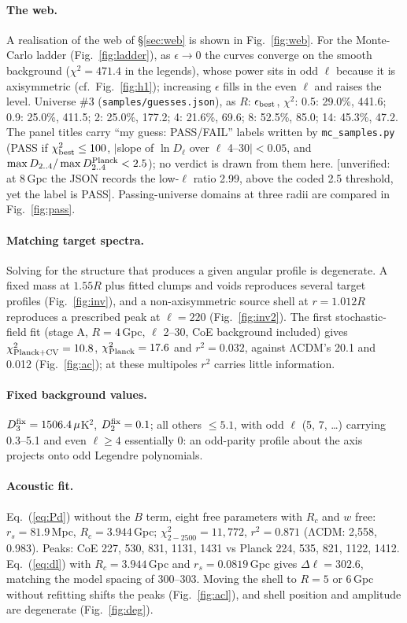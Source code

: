 \documentclass[10pt,twocolumn]{article}
\newcommand{\flag}[1]{\textsf{[unverified: #1]}}
\begin{document}
\paragraph{The web.} A realisation of the web of \S\ref{sec:web} is shown in Fig.~\ref{fig:web}. For the Monte-Carlo ladder (Fig.~\ref{fig:ladder}), as $\epsilon\to0$ the curves converge on the smooth background ($\chi^2=471.4$ in the legends), whose power sits in odd $\ell$ because it is axisymmetric (cf.\ Fig.~\ref{fig:h1}); increasing $\epsilon$ fills in the even $\ell$ and raises the level. Universe \#3 (\texttt{samples/guesses.json}), as $R$: $\epsilon_{\rm best}$, $\chi^2$: 0.5: 29.0\%, 441.6; 0.9: 25.0\%, 411.5; 2: 25.0\%, 177.2; 4: 21.6\%, 69.6; 8: 52.5\%, 85.0; 14: 45.3\%, 47.2. The panel titles carry ``my guess: PASS/FAIL'' labels written by \texttt{mc\_samples.py} (PASS if $\chi^2_{\rm best}\le100$, $|$slope of $\ln D_\ell$ over $\ell$ 4--30$|<0.05$, and $\max D_{2..4}/\max D^{\rm Planck}_{2..4}<2.5$); no verdict is drawn from them here. \flag{at 8\,Gpc the JSON records the low-$\ell$ ratio 2.99, above the coded 2.5 threshold, yet the label is PASS}. Passing-universe domains at three radii are compared in Fig.~\ref{fig:pass}.

\paragraph{Matching target spectra.} Solving for the structure that produces a given angular profile is degenerate. A fixed mass at $1.55R$ plus fitted clumps and voids reproduces several target profiles (Fig.~\ref{fig:inv}), and a non-axisymmetric source shell at $r=1.012R$ reproduces a prescribed peak at $\ell=220$ (Fig.~\ref{fig:inv2}). The first stochastic-field fit (stage A, $R=4$\,Gpc, $\ell$ 2--30, CoE background included) gives $\chi^2_{\rm Planck+CV}=10.8$, $\chi^2_{\rm Planck}=17.6$ and $r^2=0.032$, against ΛCDM's 20.1 and 0.012 (Fig.~\ref{fig:ac}); at these multipoles $r^2$ carries little information.

\paragraph{Fixed background values.} $D^{\rm fix}_3=1506.4\,\mu$K$^2$, $D^{\rm fix}_2=0.1$; all others $\le5.1$, with odd $\ell$ (5, 7, \ldots) carrying 0.3--5.1 and even $\ell\ge4$ essentially 0: an odd-parity profile about the axis projects onto odd Legendre polynomials.

\paragraph{Acoustic fit.} Eq.~(\ref{eq:Pd}) without the $B$ term, eight free parameters with $R_c$ and $w$ free: $r_s=81.9$\,Mpc, $R_c=3.944$\,Gpc; $\chi^2_{2-2500}=11{,}772$, $r^2=0.871$ (ΛCDM: 2{,}558, 0.983). Peaks: CoE 227, 530, 831, 1131, 1431 vs Planck 224, 535, 821, 1122, 1412. Eq.~(\ref{eq:dl}) with $R_c=3.944$\,Gpc and $r_s=0.0819$\,Gpc gives $\Delta\ell=302.6$, matching the model spacing of 300--303. Moving the shell to $R=5$ or 6\,Gpc without refitting shifts the peaks (Fig.~\ref{fig:acl}), and shell position and amplitude are degenerate (Fig.~\ref{fig:deg}).
\end{document}
